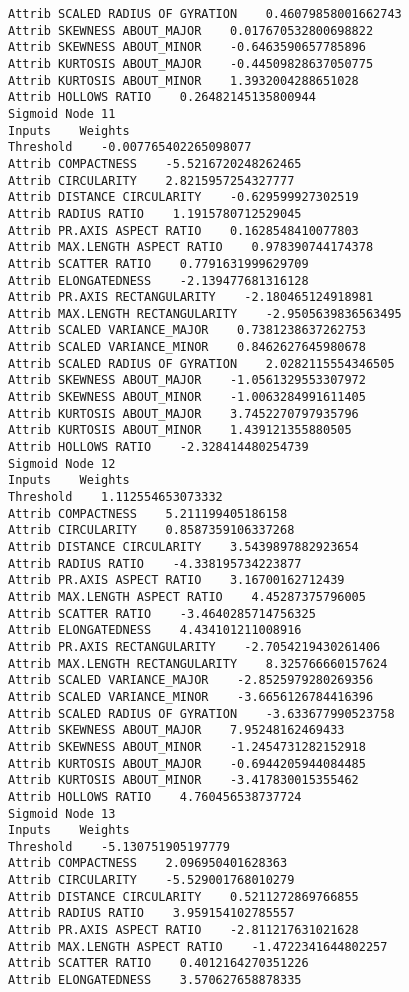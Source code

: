 \documentclass[
	article,			%
	11pt,				%
	oneside,			%
	a4paper,			%
	english,			%
	brazil,				%
	sumario=tradicional
	]{abntex2}
\begin{document}
\begin{lstlisting}
Attrib SCALED RADIUS OF GYRATION    0.46079858001662743
Attrib SKEWNESS ABOUT_MAJOR    0.017670532800698822
Attrib SKEWNESS ABOUT_MINOR    -0.6463590657785896
Attrib KURTOSIS ABOUT_MAJOR    -0.44509828637050775
Attrib KURTOSIS ABOUT_MINOR    1.3932004288651028
Attrib HOLLOWS RATIO    0.26482145135800944
Sigmoid Node 11
Inputs    Weights
Threshold    -0.007765402265098077
Attrib COMPACTNESS    -5.5216720248262465
Attrib CIRCULARITY    2.8215957254327777
Attrib DISTANCE CIRCULARITY    -0.629599927302519
Attrib RADIUS RATIO    1.1915780712529045
Attrib PR.AXIS ASPECT RATIO    0.1628548410077803
Attrib MAX.LENGTH ASPECT RATIO    0.978390744174378
Attrib SCATTER RATIO    0.7791631999629709
Attrib ELONGATEDNESS    -2.139477681316128
Attrib PR.AXIS RECTANGULARITY    -2.180465124918981
Attrib MAX.LENGTH RECTANGULARITY    -2.9505639836563495
Attrib SCALED VARIANCE_MAJOR    0.7381238637262753
Attrib SCALED VARIANCE_MINOR    0.8462627645980678
Attrib SCALED RADIUS OF GYRATION    2.0282115554346505
Attrib SKEWNESS ABOUT_MAJOR    -1.0561329553307972
Attrib SKEWNESS ABOUT_MINOR    -1.0063284991611405
Attrib KURTOSIS ABOUT_MAJOR    3.7452270797935796
Attrib KURTOSIS ABOUT_MINOR    1.439121355880505
Attrib HOLLOWS RATIO    -2.328414480254739
Sigmoid Node 12
Inputs    Weights
Threshold    1.112554653073332
Attrib COMPACTNESS    5.211199405186158
Attrib CIRCULARITY    0.8587359106337268
Attrib DISTANCE CIRCULARITY    3.5439897882923654
Attrib RADIUS RATIO    -4.338195734223877
Attrib PR.AXIS ASPECT RATIO    3.16700162712439
Attrib MAX.LENGTH ASPECT RATIO    4.45287375796005
Attrib SCATTER RATIO    -3.4640285714756325
Attrib ELONGATEDNESS    4.434101211008916
Attrib PR.AXIS RECTANGULARITY    -2.7054219430261406
Attrib MAX.LENGTH RECTANGULARITY    8.325766660157624
Attrib SCALED VARIANCE_MAJOR    -2.8525979280269356
Attrib SCALED VARIANCE_MINOR    -3.6656126784416396
Attrib SCALED RADIUS OF GYRATION    -3.633677990523758
Attrib SKEWNESS ABOUT_MAJOR    7.95248162469433
Attrib SKEWNESS ABOUT_MINOR    -1.2454731282152918
Attrib KURTOSIS ABOUT_MAJOR    -0.6944205944084485
Attrib KURTOSIS ABOUT_MINOR    -3.417830015355462
Attrib HOLLOWS RATIO    4.760456538737724
Sigmoid Node 13
Inputs    Weights
Threshold    -5.130751905197779
Attrib COMPACTNESS    2.096950401628363
Attrib CIRCULARITY    -5.529001768010279
Attrib DISTANCE CIRCULARITY    0.5211272869766855
Attrib RADIUS RATIO    3.959154102785557
Attrib PR.AXIS ASPECT RATIO    -2.811217631021628
Attrib MAX.LENGTH ASPECT RATIO    -1.4722341644802257
Attrib SCATTER RATIO    0.4012164270351226
Attrib ELONGATEDNESS    3.570627658878335

\end{lstlisting}
\end{document}
